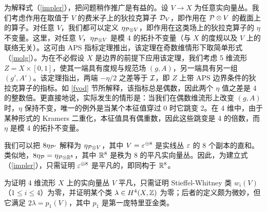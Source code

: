 为解释式（\ref{impler}），把问题稍作推广是有益的。设 $V\to X$ 为任意实向量丛。我们考虑作用在取值于 $V$ 的费米子上的狄拉克算子 $\D_V$，即作用在 $\P\otimes V$ 的截面上的算子。对任意 $V$，我们都可以定义 $\eta_{\P\otimes V}$，即作用在这类场上的狄拉克算子的 $\eta$ 不变量。这里，对任意 $V$，$\eta_{\P\otimes V}$ 是模 4 的拓扑不变量（与 $X$ 的度规以及 $V$ 上的联络无关）。这可由 APS 指标定理推出，该定理在奇数维情形下取简单形式（\ref{molg}）。为在不必假设 $X$ 是边界的前提下应用该定理，我们考虑 5 维流形 $Z=X\times [0,1]$，使其一端具有度规与规范场 $(g,A)$，另一端具有另一组 $(g',A')$。该定理指出，两端 $-\eta/2$ 之差等于 $\I$，即 $Z$ 上带 APS 边界条件的狄拉克算子的指标。如 \ref{fvod} 节所解释，该指标总是偶数，因此两个 $\eta$ 值之差是 4 的整数倍。更直接地说，实际发生的情形是：当我们在偶数维流形上改变 $(g,A)$ 时，$\eta$ 保持不变，唯一的例外是当某个本征值穿过 0 时它跳变 2。在 4 维中，由于某种形式的 Kramers 二重化，本征值具有偶重数，因此这些跳变是 4 的倍数，而 $\eta$ 是模 4 的拓扑不变量。

我们可以把 $8\eta_{\P'}$ 解释为 $\eta_{\P\otimes V}$，其中 $V=\veps^{\oplus 8}$ 是实线丛 $\veps$ 的 8 个副本的直和。类似地，$8\eta_\P=\eta_{\P\otimes \R^8}$，其中 $\R^8$ 是秩为 8 的平凡实向量丛。因此，为建立式（\ref{impler}），只需证明 $\veps^{\oplus 8}$ 是平凡的，即同构于 $\R^8$。

为证明 4 维流形 $X$ 上的实向量丛 $V$ 平凡，只需证明 Stieffel-Whitney 类 $w_i(V)$（$1\leq i\leq 4$）为零，并证明某个类 $\lambda\in H^4(X,\Z)$ 为零；后者的定义颇为微妙，但它满足 $2\lambda=p_1(V)$，其中 $p_1$ 是第一庞特里亚金类。


